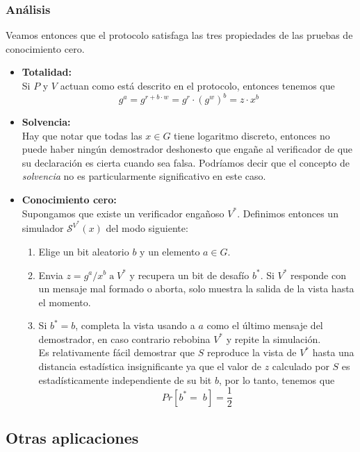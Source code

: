 \documentclass[oneside,10pt]{article}
\begin{document}
\subsubsection{Análisis}
Veamos entonces que el protocolo satisfaga las tres propiedades de las pruebas de conocimiento cero.
\begin{itemize}
\item \textbf{Totalidad:}\\
  Si $P$ y $V$ actuan como está descrito en el protocolo, entonces tenemos que
  \[g^a = g^{r+b \cdot w} = g ^r \cdot (g^w)^b = z \cdot x^b \]
\item \textbf{Solvencia:}\\
  Hay que notar que todas las $x \in G$ tiene logaritmo discreto, entonces no puede haber ningún demostrador deshonesto que engañe al verificador de que su declaración es cierta cuando sea falsa. Podríamos decir que el concepto de \emph{solvencia} no es particularmente significativo en este caso.
\item \textbf{Conocimiento cero:}\\
  Supongamos que existe un verificador engañoso $V^*$. Definimos entonces un simulador $\mathcal{S}^{V^*}(x)$ del modo siguiente:
  \begin{enumerate}
  \item Elige un bit aleatorio $b$ y un elemento $a \in G$.
  \item Envia $z = g^a/x^b \;\mathrm{a}\; V^*$ y recupera un bit de desafío $b^*$. Si $V^*$ responde con un mensaje mal formado o aborta, solo muestra la salida de la vista hasta el momento.
  \item Si $b^* = b$, completa la vista usando a $a$ como el último mensaje del demostrador, en caso contrario rebobina $V^*$ y repite la simulación.\\

    Es relativamente fácil demostrar que $S$ reproduce la vista de $V^*$ hasta una distancia estadística insignificante ya que el valor de $z$ calculado por $S$ es estadísticamente independiente de su bit $b$, por lo tanto, tenemos que \[Pr[b^* = \; b ] = \frac{1}{2}\] 
  \end{enumerate}
\end{itemize}

\subsection{Otras aplicaciones}
\end{document}
